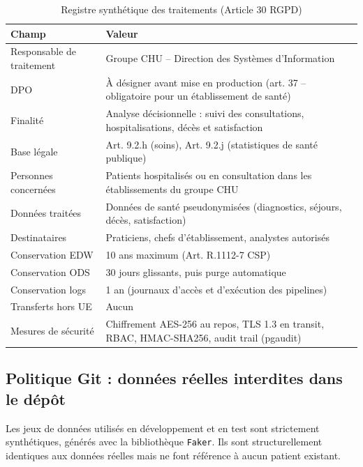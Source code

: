 \documentclass[12pt, a4paper]{report}
\begin{document}
\begin{itemize}[label=\textcolor{chuBlue}{\textbullet}]
\begin{table}[htbp]
\centering\footnotesize\renewcommand{\arraystretch}{1.5}
\begin{tabularx}{\linewidth}{@{} L{4.0cm} X @{}}
\toprule
{}
\textbf{Champ} & \textbf{Valeur} \\
\midrule
Responsable de traitement &
Groupe CHU -- Direction des Systèmes d'Information \\
DPO &
À désigner avant mise en production (art. 37 -- obligatoire pour un établissement de santé) \\
Finalité &
Analyse décisionnelle : suivi des consultations, hospitalisations, décès et satisfaction \\
Base légale &
Art. 9.2.h (soins), Art. 9.2.j (statistiques de santé publique) \\
Personnes concernées &
Patients hospitalisés ou en consultation dans les établissements du groupe CHU \\
Données traitées &
Données de santé pseudonymisées (diagnostics, séjours, décès, satisfaction) \\
Destinataires &
Praticiens, chefs d'établissement, analystes autorisés \\
Conservation EDW &
10 ans maximum (Art. R.1112-7 CSP) \\
Conservation ODS &
30 jours glissants, puis purge automatique \\
Conservation logs &
1 an (journaux d'accès et d'exécution des pipelines) \\
Transferts hors UE &
Aucun \\
Mesures de sécurité &
Chiffrement AES-256 au repos, TLS 1.3 en transit, RBAC, HMAC-SHA256, audit trail (pgaudit) \\
\bottomrule
\end{tabularx}
\caption{Registre synthétique des traitements (Article 30 RGPD)}
\label{tab:registre_art30}
\end{table}

\subsection{Politique Git : données réelles interdites dans le dépôt}

Les jeux de données utilisés en développement et en test sont strictement synthétiques, générés avec la bibliothèque \texttt{Faker}. Ils sont structurellement identiques aux données réelles mais ne font référence à aucun patient existant.


\end{itemize}
\end{document}
